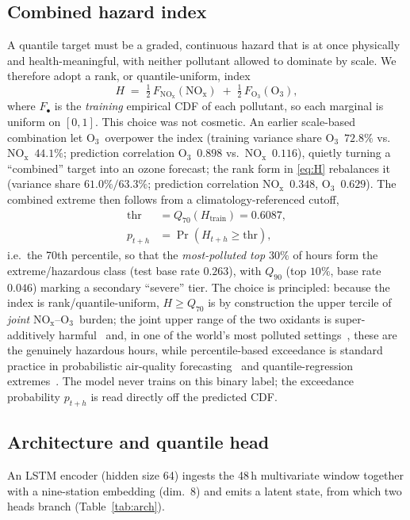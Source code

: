 \documentclass[conference]{IEEEtran}
\newcommand{\nox}{\ensuremath{\mathrm{NO_x}}}
\newcommand{\othree}{\ensuremath{\mathrm{O_3}}}
\begin{document}
\subsection{Combined hazard index}
A quantile target must be a graded, continuous hazard that is at once physically and health-meaningful,
with neither pollutant allowed to dominate by scale. We therefore adopt a rank, or quantile-uniform,
index
\begin{equation}
H \;=\; \tfrac{1}{2}\,F_{\nox}(\nox) \;+\; \tfrac{1}{2}\,F_{\othree}(\othree),
\label{eq:H}
\end{equation}
where $F_{\bullet}$ is the \emph{training} empirical CDF of each pollutant, so each marginal is uniform
on $[0,1]$. This choice was not cosmetic. An earlier scale-based combination let \othree\ overpower the
index (training variance share \othree~$72.8\%$ vs.\ \nox~$44.1\%$; prediction correlation
\othree~$0.898$ vs.\ \nox~$0.116$), quietly turning a ``combined'' target into an ozone forecast; the
rank form in \eqref{eq:H} rebalances it (variance share $61.0\%/63.3\%$; prediction correlation
\nox~$0.348$, \othree~$0.629$). The combined extreme then follows from a climatology-referenced cutoff,
\begin{equation}
\begin{aligned}
\mathrm{thr}&=Q_{70}(H_{\text{train}})=0.6087,\\
p_{t+h}&=\Pr(H_{t+h}\ge \mathrm{thr}),
\end{aligned}
\label{eq:thr}
\end{equation}
i.e.\ the 70th percentile, so that the \emph{most-polluted top $30\%$} of hours form the
extreme/hazardous class (test base rate $0.263$), with $Q_{90}$ (top $10\%$, base rate $0.046$) marking a
secondary ``severe'' tier. The choice is principled: because the index is rank/quantile-uniform,
$H\!\ge\!Q_{70}$ is by construction the upper tercile of \emph{joint} \nox--\othree\ burden; the joint
upper range of the two oxidants is super-additively harmful~\cite{fu2022} and, in one of the world's most
polluted settings~\cite{worldbank2022}, these are the genuinely hazardous hours, while percentile-based
exceedance is standard practice in probabilistic air-quality forecasting~\cite{perezvasseur2021} and
quantile-regression extremes~\cite{cannon2018}. The model never trains on this binary label; the
exceedance probability $p_{t+h}$ is read directly off the predicted CDF.

\subsection{Architecture and quantile head}
An LSTM encoder (hidden size 64) ingests the 48\,h multivariate window together with a
nine-station embedding (dim.\ 8) and emits a latent state, from which two heads branch
(Table~\ref{tab:arch}).
\end{document}
